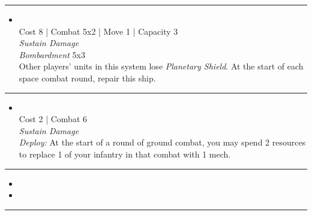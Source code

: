 \begin{multicols}{2}
\vspace{-10pt}\rule{\hsize}{0.4pt}\vspace{5pt}


\begin{itemize}
\item {}\\
Cost 8 | Combat 5x2 | Move 1 | Capacity 3 \\
\emph{Sustain Damage}\\
\emph{Bombardment} 5x3\\
Other players' units in this system lose \emph{Planetary Shield}. At the start of each space combat round, repair this ship.
\end{itemize}

\vspace{-10pt}\rule{\hsize}{0.4pt}\vspace{5pt}


\begin{itemize}
\item {}
\\
Cost 2 | Combat 6 \\
\emph{Sustain Damage}\\
\emph{Deploy:} At the start of a round of ground combat, you may spend 2 resources to replace 1 of your infantry in that combat with 1 mech.
\end{itemize}

\vspace{-10pt}\rule{\hsize}{0.4pt}\vspace{5pt}

\nounits

\columnbreak
{}

\begin{itemize}
\item \disruptors
\item \NES
\end{itemize}

\vspace{-10pt}\rule{\hsize}{0.4pt}\vspace{5pt}



\end{multicols}
